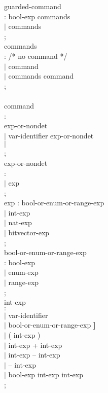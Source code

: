 \begin{tab}
\begin{tabbing}
guarded-command \\
\>: \CHOICE bool-exp \ARROW commands \\
\>$|$ \CHOICE \DEFAULT \ARROW commands \\
\>; \\


commands \\
\>: /* no command */ \\
\>$|$ command \\
\>$|$ commands \SEMICOLON command \\
\>; \\
\> \\

command \\
\>: \FORALL \DUMMYID \ARRAYORBITVECID {\bf [} \DUMMYID {\bf ]} \\
\>\> \ASSIGN exp-or-nondet  \\
\>$|$ var-identifier \ASSIGN exp-or-nondet \\
\>$|$ \EVENTSEND \\
\>; \\

exp-or-nondet \\
\>: \NONDET  \\
\>$|$ exp \\
\>; \\


exp
\>: bool-or-enum-or-range-exp  \\
\>$|$ int-exp \\
\>$|$ nat-exp  \\
\>$|$ bitvector-exp  \\
\>; \\


bool-or-enum-or-range-exp \\
\>: bool-exp  \\
\>$|$ enum-exp \\
\>$|$ range-exp  \\
\>; \\

int-exp \\
\>$:$ \NATNUM  \\
\>$|$ var-identifier \\
\>$|$ \ARRAYORBITVECID {\bf [} bool-or-enum-or-range-exp {\bf ]}  \\
\>$|$ ( int-exp ) \\
\>$|$ int-exp + int-exp \\
\>$|$ int-exp -- int-exp \\
\>$|$ -- int-exp \\
\>$|$ \IF bool-exp \THEN int-exp \ELSE int-exp \FI \\
\>; \\



\end{tabbing}
\end{tab}
